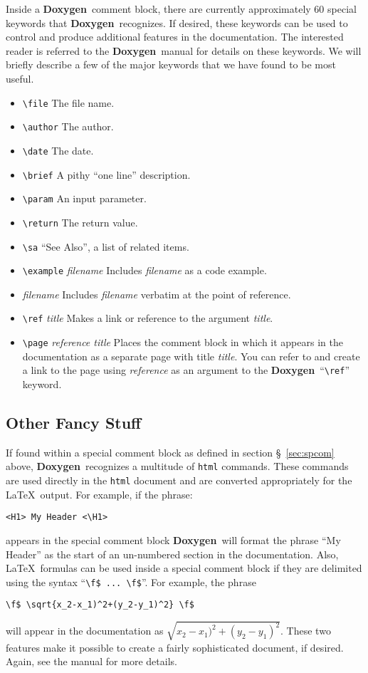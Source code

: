 \documentclass[11pt]{nmemo}
\newcommand{\doxy}{{\normalfont\bfseries Doxygen}}
\begin{document}
Inside a \doxy\ comment block, there are currently approximately 60
special keywords that \doxy\ recognizes. If desired, these keywords
can be used to control and produce additional features in the
documentation.  The interested reader is referred to the \doxy\ manual
for details on these keywords.  We will briefly describe a few of the major
keywords that we have found to be most useful.
\begin{itemize}
\item \verb+\file+ The file name.
\item \verb+\author+ The author.
\item \verb+\date+ The date.
\item \verb+\brief+ A pithy ``one line'' description.
\item \verb+\param+ An input parameter.
\item \verb+\return+ The return value.
\item \verb+\sa+ ``See Also'', a list of related items.
\item \verb+\example+ {\em filename} Includes {\em filename} as a code
  example.
\item \verb++ {\em filename} Includes {\em filename} verbatim at the
  point of reference.
\item \verb+\ref+ {\em title} Makes a link or reference 
  to the argument {\em title}.
\item \verb+\page+ {\em reference title} Places the comment block in which
  it appears in the documentation as a separate page with title {\em
    title}. You can refer to and create a link to the page using {\em
    reference} as an argument to the \doxy\ ``\verb+\ref+'' keyword.
\end{itemize}

\subsection{Other Fancy Stuff}

If found within a special comment block 
as defined in section \S~\ref{sec:spcom} above, \doxy\ 
recognizes a multitude of \texttt{html} commands. These
commands are used directly in the \texttt{html} document and are converted appropriately for
the \LaTeX\ output. 
For example, if the phrase: 
\begin{verbatim}
<H1> My Header <\H1>
\end{verbatim} appears in the special comment
block \doxy\ will format the phrase ``My Header'' as the start of an
un-numbered section in the documentation. 
Also, \LaTeX\ formulas can be used inside a special
comment block if they are delimited using the syntax ``\verb+\f$ ... \f$+''.
For example, the phrase 
\begin{verbatim}
\f$ \sqrt{x_2-x_1)^2+(y_2-y_1)^2} \f$ 
\end{verbatim}  will appear in the
documentation as $\sqrt{x_2-x_1)^2+(y_2-y_1)^2}$.
These two
features make it possible to create a fairly sophisticated document, if desired.
Again, see the manual for more details.
\end{document}
